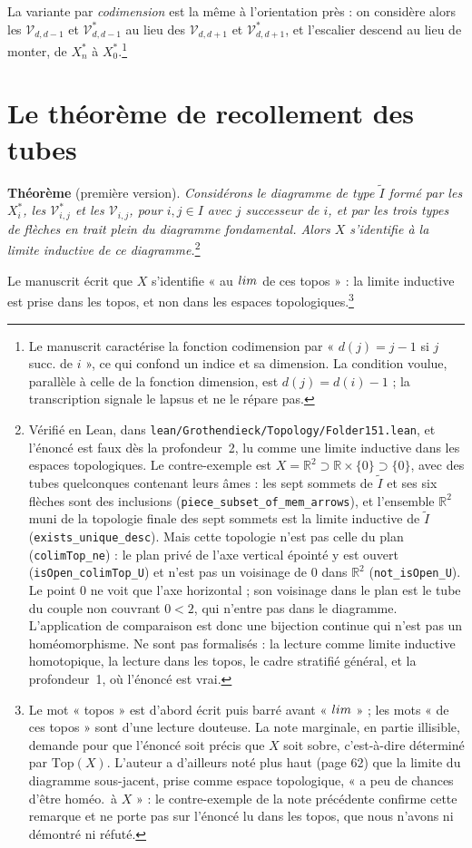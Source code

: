 \documentclass[11pt,a4paper]{article}
\begin{document}
La variante par \emph{codimension} est la même à l'orientation près : on
considère alors les $\mathcal{V}_{d,d-1}$ et $\mathcal{V}^{*}_{d,d-1}$ au lieu
des $\mathcal{V}_{d,d+1}$ et $\mathcal{V}^{*}_{d,d+1}$, et l'escalier descend au
lieu de monter, de $X_{n}^{*}$ à $X_{0}^{*}$.\footnote{Le manuscrit caractérise
la fonction codimension par « $d(j) = j - 1$ si $j$ succ. de $i$ », ce qui
confond un indice et sa dimension. La condition voulue, parallèle à celle de la
fonction dimension, est $d(j) = d(i) - 1$ ; la transcription signale le lapsus
et ne le répare pas.}

\section*{Le théorème de recollement des tubes}

\textbf{Théorème} (première version). \emph{Considérons le diagramme de type
$\widetilde{I}$ formé par les $X_{i}^{*}$, les $\mathcal{V}^{*}_{i,j}$ et les
$\mathcal{V}_{i,j}$, pour $i,j \in I$ avec $j$ successeur de $i$, et par les
trois types de flèches en trait plein du diagramme fondamental. Alors $X$
s'identifie à la limite inductive de ce diagramme.}\footnote{Vérifié en Lean,
dans \texttt{lean/Grothendieck/Topology/Folder151.lean}, et l'énoncé est faux dès la
profondeur~2, lu comme une limite inductive dans les espaces topologiques.
Le contre-exemple est $X = \mathbb{R}^{2} \supset \mathbb{R} \times \{0\}
\supset \{0\}$, avec des tubes quelconques contenant leurs âmes : les sept
sommets de $\widetilde{I}$ et ses six flèches sont des inclusions
(\texttt{piece\_subset\_of\_mem\_arrows}), et l'ensemble $\mathbb{R}^{2}$ muni de
la topologie finale des sept sommets est la limite inductive de $\widetilde{I}$
(\texttt{exists\_unique\_desc}). Mais cette topologie n'est pas celle du plan
(\texttt{colimTop\_ne}) : le plan privé de l'axe vertical épointé y est ouvert
(\texttt{isOpen\_colimTop\_U}) et n'est pas un voisinage de $0$ dans
$\mathbb{R}^{2}$ (\texttt{not\_isOpen\_U}). Le point $0$ ne voit que l'axe
horizontal ; son voisinage dans le plan est le tube du couple non couvrant
$0 < 2$, qui n'entre pas dans le diagramme. L'application de comparaison est
donc une bijection continue qui n'est pas un homéomorphisme. Ne sont pas
formalisés : la lecture comme limite inductive homotopique, la lecture dans les
topos, le cadre stratifié général, et la profondeur~1, où l'énoncé est vrai.}

Le manuscrit écrit que $X$ s'identifie « au $\varinjlim$ de ces topos » : la
limite inductive est prise dans les topos, et non dans les espaces
topologiques.\footnote{Le mot « topos » est d'abord écrit puis barré avant
« $\varinjlim$ » ; les mots « de ces topos » sont d'une lecture douteuse. La
note marginale, en partie illisible, demande pour que l'énoncé soit précis que
$X$ soit sobre, c'est-à-dire déterminé par $\mathrm{Top}(X)$. L'auteur a
d'ailleurs noté plus haut (page 62) que la limite du diagramme sous-jacent,
prise comme espace topologique, « a peu de chances d'être homéo.\ à $X$ » : le
contre-exemple de la note précédente confirme cette remarque et ne porte pas
sur l'énoncé lu dans les topos, que nous n'avons ni démontré ni réfuté.}
\end{document}
